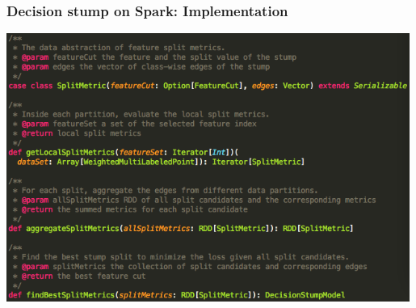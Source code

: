 \documentclass{beamer}
\begin{document}
\begin{frame}
\frametitle{Decision stump on Spark: Implementation}
\includegraphics[width=0.99\textwidth]{img/decision_stump_spark.png}
\end{frame}
\end{document}
